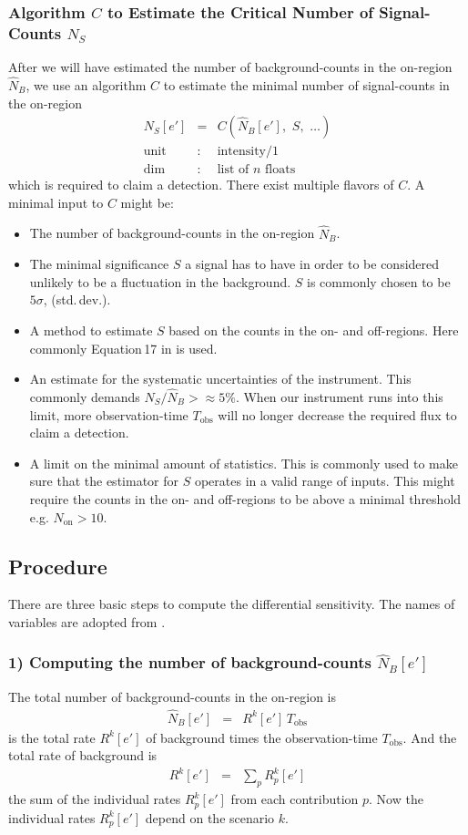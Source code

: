 \documentclass{article}%
\begin{document}
\subsubsection*{Algorithm $C$ to Estimate the Critical Number of Signal-Counts $N_S$}
%
After we will have estimated the number of background-counts in the on-region $\hat{N}_B$, we use an algorithm $C$ to estimate the minimal number of signal-counts in the on-region
%
\begin{eqnarray*}
N_S[e'] &=& C(\hat{N}_B[e'],\,\,S,\,\,\dots)\\
\text{unit} &:& \text{intensity}/1\\
\text{dim} &:& \text{list of}\,\,n\,\,\text{floats}
\end{eqnarray*}
%
which is required to claim a detection.
%
There exist multiple flavors of $C$.
%
A minimal input to $C$ might be:
%
\begin{itemize}
%
\item{} The number of background-counts in the on-region $\hat{N}_B$.
%
\item{} The minimal significance $S$ a signal has to have in order to be considered unlikely to be a fluctuation in the background.
%
$S$ is commonly chosen to be $5\sigma$, (std.\,dev.).
%
\item{} A method to estimate $S$ based on the counts in the on- and off-regions. Here commonly Equation\,17 in \cite{li1983analysis} is used.
%
\item{} An estimate for the systematic uncertainties of the instrument. This commonly demands $N_S/\hat{N}_B >\approx 5\%$.
%
When our instrument runs into this limit, more observation-time $T_\text{obs}$ will no longer decrease the required flux to claim a detection.
%
\item{}
A limit on the minimal amount of statistics. This is commonly used to make sure that the estimator for $S$ operates in a valid range of inputs.
%
This might require the counts in the on- and off-regions to be above a minimal threshold e.g. $N_\text{on} > 10$.
%
\end{itemize}
%
\subsection{Procedure}
\label{SubSecProcedure}
%
There are three basic steps to compute the differential sensitivity.
%
The names of variables are adopted from \cite{li1983analysis}.
%
\subsubsection*{1) Computing the number of background-counts $\hat{N}_B[e']$}
%
The total number of background-counts in the on-region is
%
\begin{eqnarray}
\hat{N}_B[e'] &=& R^k[e'] \, T_\text{obs}
\end{eqnarray}
%
is the total rate $R^k[e']$ of background times the observation-time $T_\text{obs}$.
%
And the total rate of background is
%
\begin{eqnarray}
R^k[e'] &=& \sum_{p} R^k_p[e']
\end{eqnarray}
%
the sum of the individual rates $R^k_p[e']$ from each contribution $p$.
%
Now the individual rates $R^k_p[e']$ depend on the scenario $k$.
%
\end{document}
